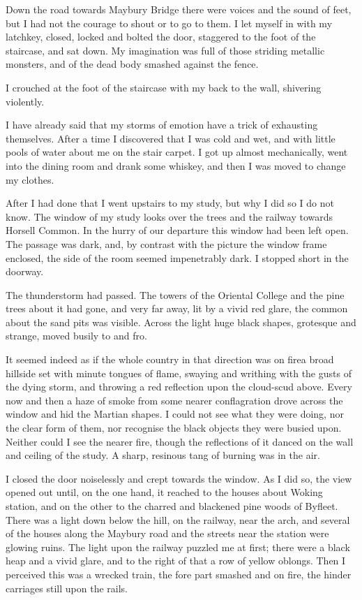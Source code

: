 Down the road towards Maybury Bridge there were voices and the
sound of feet, but I had not the courage to shout or to go to them.
I let myself in with my latchkey, closed, locked and bolted the
door, staggered to the foot of the staircase, and sat down. My
imagination was full of those striding metallic monsters, and of
the dead body smashed against the fence.

I crouched at the foot of the staircase with my back to the wall,
shivering violently.

I have already said that my storms of emotion have a trick of
exhausting themselves. After a time I discovered that I was cold
and wet, and with little pools of water about me on the stair
carpet. I got up almost mechanically, went into the dining room and
drank some whiskey, and then I was moved to change my clothes.

After I had done that I went upstairs to my study, but why I did so
I do not know. The window of my study looks over the trees and the
railway towards Horsell Common. In the hurry of our departure this
window had been left open. The passage was dark, and, by contrast
with the picture the window frame enclosed, the side of the room
seemed impenetrably dark. I stopped short in the doorway.

The thunderstorm had passed. The towers of the Oriental College and
the pine trees about it had gone, and very far away, lit by a vivid
red glare, the common about the sand pits was visible. Across the
light huge black shapes, grotesque and strange, moved busily to and
fro.

It seemed indeed as if the whole country in that direction was on
fire\dash{}a broad hillside set with minute tongues of flame, swaying
and writhing with the gusts of the dying storm, and throwing a red
reflection upon the cloud-scud above. Every now and then a haze of
smoke from some nearer conflagration drove across the window and
hid the Martian shapes. I could not see what they were doing, nor
the clear form of them, nor recognise the black objects they were
busied upon. Neither could I see the nearer fire, though the
reflections of it danced on the wall and ceiling of the study. A
sharp, resinous tang of burning was in the air.

I closed the door noiselessly and crept towards the window. As I
did so, the view opened out until, on the one hand, it reached to
the houses about Woking station, and on the other to the charred
and blackened pine woods of Byfleet. There was a light down below
the hill, on the railway, near the arch, and several of the houses
along the Maybury road and the streets near the station were
glowing ruins. The light upon the railway puzzled me at first;
there were a black heap and a vivid glare, and to the right of that
a row of yellow oblongs. Then I perceived this was a wrecked train,
the fore part smashed and on fire, the hinder carriages still upon
the rails.

